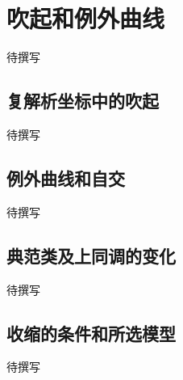 
% 
% 

\section{吹起和例外曲线}
\label{g4:sec:3002}

待撰写

\subsection{复解析坐标中的吹起}
\label{g4:subsec:3002:01}
待撰写

\subsection{例外曲线和自交}
\label{g4:subsec:3002:02}
待撰写

\subsection{典范类及上同调的变化}
\label{g4:subsec:3002:03}
待撰写

\subsection{收缩的条件和所选模型}
\label{g4:subsec:3002:04}
待撰写
